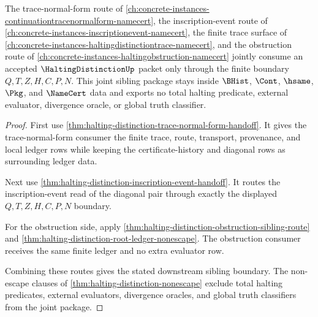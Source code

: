 \begin{theorem}
\label{thm:halting-distinction-obstruction-sibling-joint-package}
The trace-normal-form route of \autoref{ch:concrete-instances-continuationtracenormalform-namecert}, the inscription-event route of \autoref{ch:concrete-instances-inscriptionevent-namecert}, the finite trace surface of \autoref{ch:concrete-instances-haltingdistinctiontrace-namecert}, and the obstruction route of \autoref{ch:concrete-instances-haltingobstruction-namecert} jointly consume an accepted $\HaltingDistinctionUp$ packet only through the finite boundary $Q,T,Z,H,C,P,N$. This joint sibling package stays inside $\BHist$, $\Cont$, $\hsame$, $\Pkg$, and $\NameCert$ data and exports no total halting predicate, external evaluator, divergence oracle, or global truth classifier.
\end{theorem}
\begin{proof}
First use \autoref{thm:halting-distinction-trace-normal-form-handoff}. It gives the trace-normal-form consumer the finite trace, route, transport, provenance, and local ledger rows while keeping the certificate-history and diagonal rows as surrounding ledger data.

Next use \autoref{thm:halting-distinction-inscription-event-handoff}. It routes the inscription-event read of the diagonal pair through exactly the displayed $Q,T,Z,H,C,P,N$ boundary.

For the obstruction side, apply \autoref{thm:halting-distinction-obstruction-sibling-route} and \autoref{thm:halting-distinction-root-ledger-nonescape}. The obstruction consumer receives the same finite ledger and no extra evaluator row.

Combining these routes gives the stated downstream sibling boundary. The non-escape clauses of \autoref{thm:halting-distinction-nonescape} exclude total halting predicates, external evaluators, divergence oracles, and global truth classifiers from the joint package.
\end{proof}

